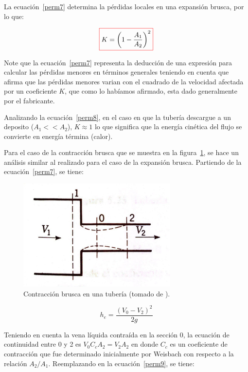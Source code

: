 \documentclass[11pt, oneside]{article}
\begin{document}
La ecuaci\'on~\ref{perm7} determina la p\'erdidas locales en una expansi\'on brusca, por lo que:

\begin{equation}
\color{red}\boxed{\color{black} K = \left( 1- \frac{A_1}{A_2} \right)^2 }
\label{perm8}
\end{equation}

Note que la ecuaci\'on~\ref{perm7} representa la deducci\'on de una expresi\'on para calcular las p\'erdidas menores en t\'erminos generales teniendo en cuenta que afirma que las p\'erdidas menores varian con el cuadrado de la velocidad afectada por un coeficiente $K$, que como lo hab\'iamos afirmado, esta dado generalmente por el fabricante. 

Analizando la ecuaci\'on~\ref{perm8}, en el caso en que la tuber\'ia descargue a un deposito ($A_1 << A_2$),  $K \approx 1$ lo que significa que la energ\'ia cin\'etica del flujo se convierte en energ\'ia t\'ermina (calor).  

Para el caso de la contracci\'on brusca que se muestra en la figura~\ref{contr}, se hace un an\'alisis similar al realizado para el caso de la expansi\'on brusca. Partiendo de la ecuaci\'on~\ref{perm7}, se tiene:

\begin{figure}[h]
\centering
\includegraphics[width=8cm]{contr.jpeg}
\caption{Contracci\'on brusca en una tuber\'ia (tomado de \cite{streeter}).}
\label{contr}
\end{figure}

\begin{equation}
h_e = \frac{(V_0 - V_2)^2}{2g} 
\label{perm9}
\end{equation}

Teniendo en cuenta la vena l\'iquida contra\'ida en la secci\'on 0, la ecuaci\'on de continuidad entre 0 y 2 es $V_0 C_c A_2 = V_2 A_2$ en donde $C_c$ es un coeficiente de contracci\'on que fue determinado inicialmente por Weisbach con respecto a la relaci\'on $A_2 /A_1$. Reemplazando en la ecuaci\'on~\ref{perm9}, se tiene:
\end{document}
